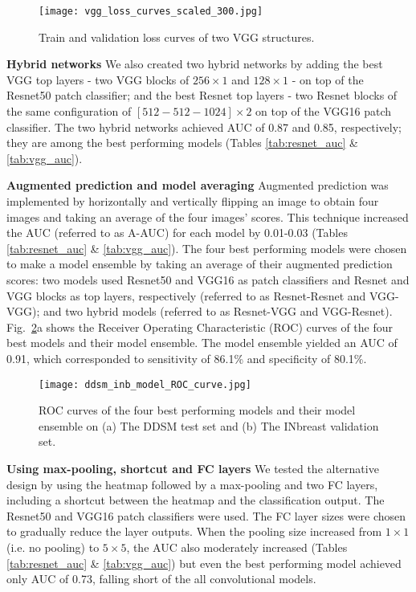 \documentclass[12pt,letterpaper]{article}
\begin{document}
\begin{figure}
  \centering
  \texttt{[image: vgg\_loss\_curves\_scaled\_300.jpg]}
  \caption{Train and validation loss curves of two VGG structures.}
  \label{fig:vgg_loss}
\end{figure}


\textbf{Hybrid networks}
\label{hybrid_auc}
We also created two hybrid networks by adding the best VGG top layers - two VGG blocks of $256 \times 1$ and $128 \times 1$ - on top of the Resnet50 patch classifier; and the best Resnet top layers - two Resnet blocks of the same configuration of $[512-512-1024] \times 2$ on top of the VGG16 patch classifier. The two hybrid networks achieved AUC of 0.87 and 0.85, respectively; they are among the best performing models (Tables \ref{tab:resnet_auc} \& \ref{tab:vgg_auc}).

\textbf{Augmented prediction and model averaging}
\label{augmented_ensemble}
Augmented prediction was implemented by horizontally and vertically flipping an image to obtain four images and taking an average of the four images' scores. This technique increased the AUC (referred to as A-AUC) for each model by 0.01-0.03 (Tables \ref{tab:resnet_auc} \& \ref{tab:vgg_auc}). The four best performing models were chosen to make a model ensemble by taking an average of their augmented prediction scores: two models used Resnet50 and VGG16 as patch classifiers and Resnet and VGG blocks as top layers, respectively (referred to as Resnet-Resnet and VGG-VGG); and two hybrid models (referred to as Resnet-VGG and VGG-Resnet). Fig.~\ref{fig:roc_curve}a shows the Receiver Operating Characteristic (ROC) curves of the four best models and their model ensemble. The model ensemble yielded an AUC of 0.91, which corresponded to sensitivity of 86.1\% and specificity of 80.1\%.

\begin{figure}
  \centering
  \texttt{[image: ddsm\_inb\_model\_ROC\_curve.jpg]}
  \caption{ROC curves of the four best performing models and their model ensemble on (a) The DDSM test set and (b) The INbreast validation set.}
  \label{fig:roc_curve}
\end{figure}

\textbf{Using max-pooling, shortcut and FC layers}
\label{pool_fc_auc}
We tested the alternative design by using the heatmap followed by a max-pooling and two FC layers, including a shortcut between the heatmap and the classification output. The Resnet50 and VGG16 patch classifiers were used. The FC layer sizes were chosen to gradually reduce the layer outputs. When the pooling size increased from $1 \times 1$ (i.e. no pooling) to $5 \times 5$, the AUC also moderately increased (Tables \ref{tab:resnet_auc} \& \ref{tab:vgg_auc}) but even the best performing model achieved only AUC of 0.73, falling short of the all convolutional models.
\end{document}
